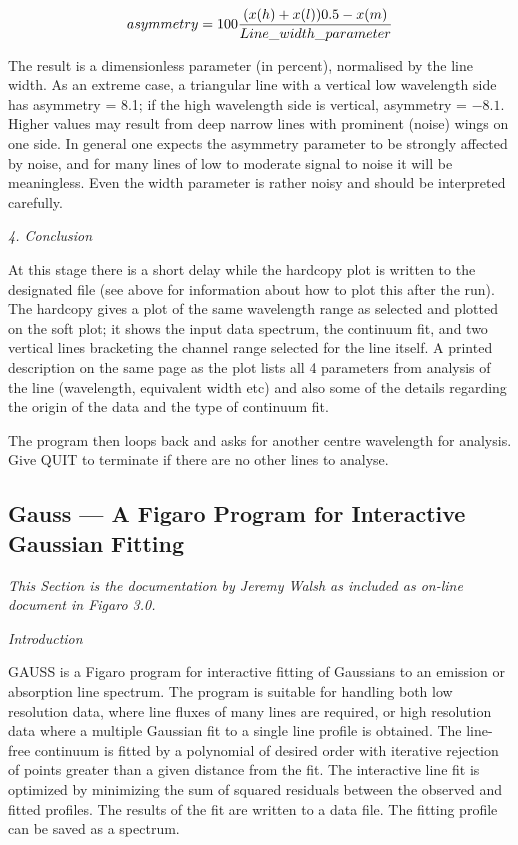 \begin{enumerate}
   $$asymmetry = 100 {(x(h)+x(l)) 0.5 - x(m)\over
      Line\_width\_parameter}$$

   The result is a dimensionless parameter (in percent), normalised by
   the line width. As an extreme case, a triangular line with a vertical
   low wavelength side has asymmetry = 8.1; if the high wavelength side
   is vertical, asymmetry = $-8.1$. Higher values may result from deep
   narrow lines with prominent (noise) wings on one side. In general one
   expects the asymmetry parameter to be strongly affected by noise, and
   for many lines of low to moderate signal to noise it will be
   meaningless. Even the width parameter is rather noisy and should be
   interpreted carefully.
\end{enumerate}


\goodbreak
\vspace{12pt}
{\it 4. Conclusion}

At this stage there is a short delay while the hardcopy plot is written to 
the designated file (see above for information about how to plot this after 
the run). The hardcopy gives a plot of the same wavelength range as 
selected and plotted on the soft plot; it shows the input data spectrum, 
the continuum fit, and two vertical lines bracketing the channel range 
selected for the line itself. A printed description on the same page as the 
plot lists all 4 parameters from analysis of the line (wavelength, 
equivalent width etc) and also some of the details regarding the origin of 
the data and the type of continuum fit.

The program then loops back and asks for another centre wavelength for 
analysis. Give QUIT to terminate if there are no other lines to analyse.


\subsection{Gauss --- A Figaro Program for Interactive Gaussian Fitting}

{\it This Section is the documentation by Jeremy Walsh as included as on-line
document in Figaro 3.0.}

\vspace{12pt}
{\it Introduction}

GAUSS is a Figaro program for interactive fitting of Gaussians to an emission
or absorption line spectrum. The program is suitable for handling both low 
resolution data, where line fluxes of many lines are required, or high 
resolution data where a multiple Gaussian fit to a single line profile is 
obtained. The line-free continuum is fitted by a polynomial of desired order
with iterative rejection of points greater than a given distance from the fit. 
The interactive line fit is optimized by minimizing the sum of squared
residuals
between the observed and fitted profiles. The results of the fit are written
to a data file. The fitting profile can be saved as a spectrum.

